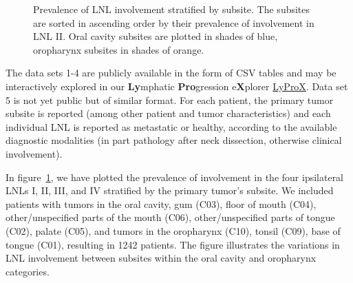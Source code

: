 \documentclass[11pt,twocolumn,twoside]{article}
\begin{document}
\begin{figure}[b]


\caption{\label{fig-prevalence-by-subsite}Prevalence of LNL involvement
stratified by subsite. The subsites are sorted in ascending order by
their prevalence of involvement in LNL II. Oral cavity subsites are
plotted in shades of blue, oropharynx subsites in shades of orange.}

\end{figure}%

The data sets 1-4 are publicly available in the form of CSV tables
\autocite{ludwig_detailed_2022,ludwig_multi-centric_2023} and may be
interactively explored in our \textbf{Ly}mphatic \textbf{Pro}gression
e\textbf{X}plorer \href{https://lyprox.org}{LyProX}. Data set 5 is not
yet public but of similar format. For each patient, the primary tumor
subsite is reported (among other patient and tumor characteristics) and
each individual LNL is reported as metastatic or healthy, according to
the available diagnostic modalities (in part pathology after neck
dissection, otherwise clinical involvement).

In figure~\ref{fig-prevalence-by-subsite}, we have plotted the
prevalence of involvement in the four ipsilateral LNLs I, II, III, and
IV stratified by the primary tumor's subsite. We included patients with
tumors in the oral cavity, gum (C03), floor of mouth (C04),
other/unspecified parts of the mouth (C06), other/unspecified parts of
tongue (C02), palate (C05), and tumors in the oropharynx (C10), tonsil
(C09), base of tongue (C01), resulting in 1242 patients. The figure
illustrates the variations in LNL involvement between subsites within
the oral cavity and oropharynx categories.
\end{document}

